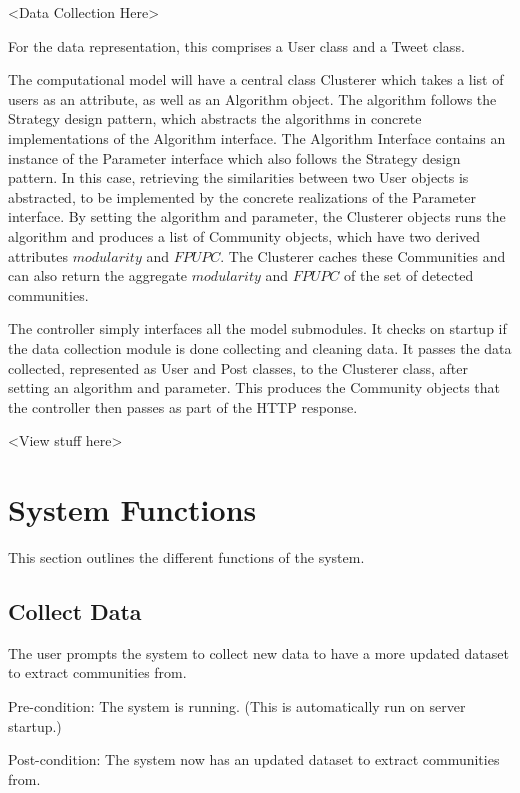 \newpage

\textless Data Collection Here\textgreater

For the data representation, this comprises a User class and a Tweet class.

The computational model will have a central class Clusterer which takes a list of users as an attribute, 
as well as an Algorithm object. The algorithm follows the Strategy design pattern, which abstracts the algorithms in
concrete implementations of the Algorithm interface. The Algorithm Interface contains an instance of the Parameter interface
which also follows the Strategy design pattern. In this case, retrieving the similarities between two User objects is abstracted,
to be implemented by the concrete realizations of the Parameter interface. By setting the algorithm and parameter, the Clusterer objects 
runs the algorithm and produces a list of Community objects, which have two derived attributes $modularity$ and $FPUPC$. The Clusterer caches
these Communities and can also return the aggregate $modularity$ and $FPUPC$ of the set of detected communities.

The controller simply interfaces all the model submodules. It checks on startup if the data collection module is done collecting and cleaning data. It passes the data collected, represented as User and Post classes, to the Clusterer class, after setting an algorithm and parameter. This produces the Community objects that the controller then passes as part of the HTTP response.

\textless View stuff here\textgreater

\section{System Functions}

This section outlines the different functions of the system.

\subsection{Collect Data}
\label{us:colldat}

The user prompts the system to collect new data to have a more updated dataset to extract communities from.

Pre-condition: The system is running. (This is automatically run on server startup.)

Post-condition: The system now has an updated dataset to extract communities from.

